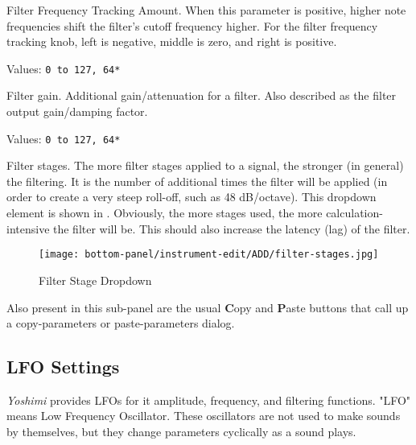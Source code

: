    Filter Frequency Tracking Amount.
   When this parameter is positive, higher note
   frequencies shift the filter’s cutoff frequency higher.
   For the filter frequency tracking knob, left is negative, middle is
   zero, and right is positive.

   Values: \texttt{0 to 127, 64*}

   Filter gain.
   Additional gain/attenuation for a filter.
   Also described as the filter output gain/damping factor.

   Values: \texttt{0 to 127, 64*}

   Filter stages.
   The more filter stages applied to a signal, the stronger (in general) the
   filtering.
   It is the number of additional times the filter will be applied (in
   order to create a very steep roll-off, such as 48 dB/octave).
   This dropdown
   element is shown in
   .
   Obviously, the more stages used, the more calculation-intensive the
   filter will be.  This should also increase the latency (lag) of the
   filter.


\begin{figure}[H]
   \centering 
   \texttt{[image: bottom-panel/instrument-edit/ADD/filter-stages.jpg]}
   \caption[Filter Stage Dropdown]{Filter Stage Dropdown}
   \label{fig:filter_stage_dropdown} 
\end{figure}

   Also present in this sub-panel are the usual \textbf{C}opy
   and \textbf{P}aste buttons that call up a copy-parameters or
   paste-parameters dialog.

\subsection{LFO Settings}
\label{subsec:lfo_settings}

   \textsl{Yoshimi} provides LFOs for it amplitude, frequency, and filtering
   functions.
   "LFO" means Low Frequency Oscillator. These oscillators are not used to make
   sounds by themselves, but they change parameters cyclically as a sound
   plays.

